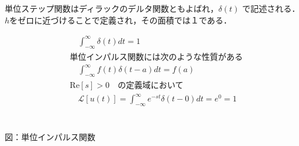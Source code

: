 \documentclass[a4paper,12pt]{article}
\begin{document}
\begin{tcolorbox}[title={[3] 単位インパルス関数 \( x(t) = \delta(t) \)をラプラス変換せよ．}]

  \vspace{4mm}
  
  \quad 単位ステップ関数はディラックのデルタ関数ともよばれ，\( \delta(t) \) で記述される．\\
  \quad \(h\)をゼロに近づけることで定義され，その面積では１である．
  
  \vspace{-4mm}
  
  \begin{minipage}[t]{0.6\linewidth}
      \begin{align*}
          &\quad \mathcal \int_{-\infty}^{\infty} \delta(t) dt = 1 \\[2mm]
          &\text{単位インパルス関数には次のような性質がある} \\[2mm]
          &\quad \mathcal \int_{-\infty}^{\infty} f(t)\delta(t-a) dt = f(a) \\[2mm]
          &\mathrm{Re}[s] > 0 \quad \text{の定義域において} \\[2mm]
          &\quad \mathcal{L}[u(t)] = \mathcal \int_{-\infty}^{\infty} e^{-st}\delta(t-0) dt = e^0=1\\
      \end{align*}
  \end{minipage}
  \hfill
  \begin{minipage}[t]{0.35\linewidth}
  \vspace{10mm}
  \begin{center}
      \\
      図：単位インパルス関数
  \end{center}
  \end{minipage}
  
\end{tcolorbox}
\end{document}
